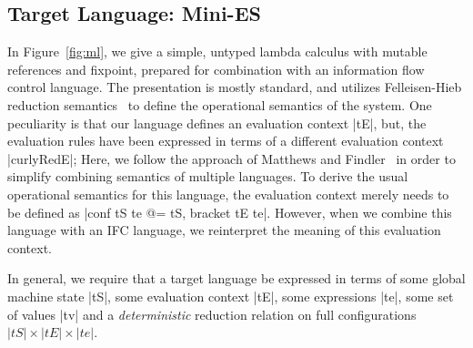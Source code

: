 \subsection{Target Language: Mini-ES}

In Figure~\ref{fig:ml}, we give a simple, untyped lambda calculus with
mutable references and fixpoint, prepared for combination with an
information flow control language.  The presentation is mostly standard, and utilizes Felleisen-Hieb reduction
semantics~\cite{Felleisen:1992:RRS:136293.136297} to define the
operational semantics of the system.  One peculiarity is that our language
defines an evaluation context |tE|, but, the evaluation rules have been
expressed in terms of a different evaluation context |curlyRedE|;
Here, we follow the approach of Matthews and
Findler~\cite{Matthews:2007:OSM:1190216.1190220} in order to simplify combining
semantics of multiple languages. 
To derive the usual operational semantics for this language, the evaluation
context merely needs to be defined as |conf tS te @= tS, bracket tE te|.
However, when we combine this language with an IFC language, we
reinterpret the meaning of this evaluation context.

In general, we require that a target language be expressed in terms
of some global machine state |tS|, some evaluation context |tE|,
some expressions |te|, some set of values |tv| and a \emph{deterministic}
reduction relation on full configurations $|tS| \times |tE| \times |te|$.

